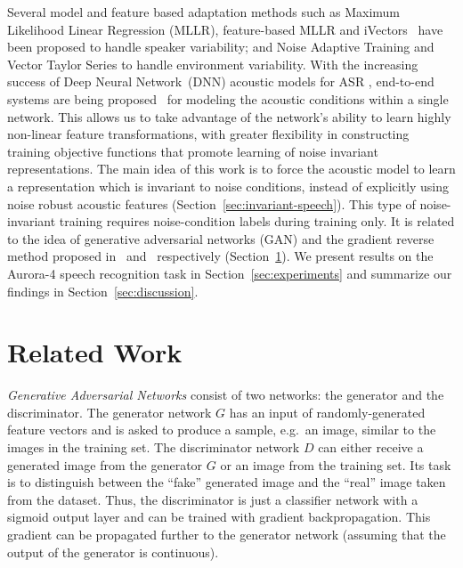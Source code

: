 \documentclass[a4paper]{article}
\begin{document}
    Several model and feature based adaptation methods such as Maximum 
    Likelihood Linear Regression (MLLR),  feature-based MLLR and 
    iVectors~\citep{saon2013speaker} have been proposed to handle speaker 
    variability; and Noise Adaptive Training \citep[NAT;][]{kalinli2010noise}
    and Vector Taylor Series \citep[VTS;][]{un1998speech} to handle 
    environment variability.
    With the increasing success of Deep Neural 
    Network~(DNN) acoustic models for ASR 
    \citep{hinton2012deep,seide2011conversational,sainath2011making}, 
    end-to-end systems are being 
    proposed~\citep{miao2015eesen,sainath2015learning} for modeling the 
    acoustic conditions within a single network. This allows us to take 
    advantage of the network's ability to learn highly non-linear feature 
    transformations, with greater flexibility in constructing training 
    objective functions that promote learning of noise invariant 
    representations.
    The main idea of this work is to force the acoustic model 
    to learn a representation which is invariant to noise conditions, instead of 
    explicitly using noise robust acoustic features 
    (Section~\ref{sec:invariant-speech}). This type of noise-invariant 
    training requires noise-condition labels during training only. It is 
    related to the idea of generative adversarial networks (GAN) and the 
    gradient reverse method proposed in~\cite{goodfellow2014generative} 
    and~\cite{ganin2014unsupervised} respectively 
    (Section~\ref{sec:relatedwork}). We present results on the Aurora-4 speech 
    recognition task in Section~\ref{sec:experiments} and summarize 
    our findings in Section~\ref{sec:discussion}.

\section{Related Work}
\label{sec:relatedwork}
\emph{Generative Adversarial Networks} consist of two networks: the generator and the discriminator. 
    The generator network $G$ has an
    input of randomly-generated feature vectors and is asked to produce a
    sample, e.g.\ an image, similar to the images in the training set. The discriminator network $D$
    can either receive a generated image from the generator $G$ or an image
    from the training set. Its task is to distinguish
    between the ``fake'' generated image and the ``real'' image taken from the dataset. Thus,
    the discriminator is just a classifier network with a sigmoid output layer
    and can be trained with gradient backpropagation. This gradient can be propagated further
    to the generator network (assuming that the output of the generator is
    continuous).
\end{document}
